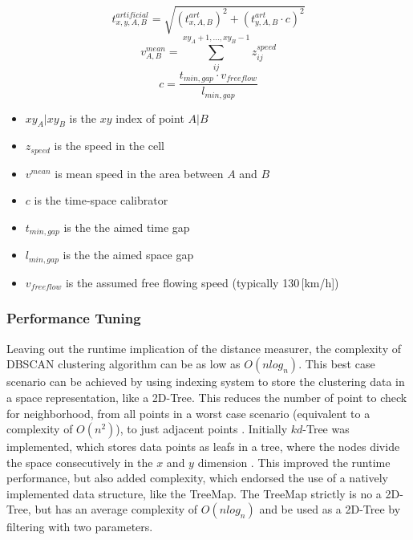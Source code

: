 \documentclass[a4paper,headsepline,footsepline,fontsize=11pt,BCOR=12mm,DIV=12]{report}
\begin{document}
\begin{equation}
	t_{x,y,A,B}^{artificial} = \sqrt{(t_{x,A,B}^{art})^2 + (t_{y,A,B}^{art} \cdot c)^2}
\end{equation}
\begin{equation}
	v_{A,B}^{mean} = \sum_{ij}^{xy_A + 1,...,xy_B - 1} z_{ij}^{speed}
\end{equation}
\begin{equation}
	c = \frac{t_{min,gap} \cdot v_{freeflow}}{l_{min,gap}}
\end{equation}

\begin{itemize}
	\setlength\itemsep{0.1em}	
	\item[] $xy_A | xy_B$ is the $xy$ index of point $A | B$
	\item[] $z_{speed}$ is the speed in the cell
	\item[] $v^{mean}$ is mean speed in the area between $A$ and $B$
	\item[] $c$ is the time-space calibrator
	\item[] $t_{min,gap}$ is the the aimed time gap
	\item[] $l_{min,gap}$ is the the aimed space gap
	\item[] $v_{freeflow}$ is the assumed free flowing speed (typically 130\,[km/h])
\end{itemize}


\subsubsection{Performance Tuning}
Leaving out the runtime implication of the distance measurer, the complexity of DBSCAN clustering algorithm can be as low as $O(nlog_n)$. This best case scenario can be achieved by using indexing system to store the clustering data in a space representation, like a 2D-Tree. This reduces the number of point to check for neighborhood, from all points in a worst case scenario (equivalent to a complexity of $O(n^2)$), to just adjacent points \cite{Chauhan2020}. Initially $kd$-Tree was implemented, which stores data points as leafs in a tree, where the nodes divide the space consecutively in the $x$ and $y$ dimension \cite{Hucker2020,Dalitz2009}. This improved the runtime performance, but also added complexity, which endorsed the use of a natively implemented data structure, like the TreeMap. The TreeMap strictly is no a 2D-Tree, but has an average complexity of $O(nlog_n)$ and be used as a 2D-Tree by filtering with two parameters. \cite{Baeldung2020_1,Baeldung2020_2}
\end{document}
